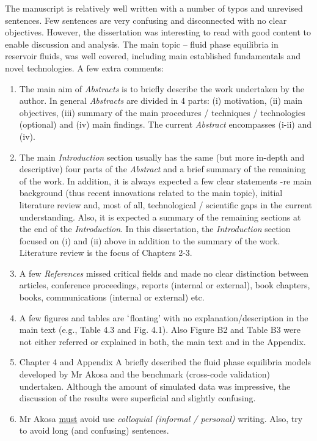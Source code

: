 \documentclass[14pt,twoside]{report}
\begin{document}
The manuscript is relatively well written with a number of typos and unrevised sentences. Few sentences are very confusing and disconnected with no clear objectives. However, the dissertation was interesting to read with good content to enable discussion and analysis. The main topic -- fluid phase equilibria in reservoir fluids, was well covered, including main established fundamentals and novel technologies. A few extra comments:
\begin{enumerate}
\item The main aim of {\it Abstracts} is to briefly describe the work undertaken by the author. In general {\it Abstracts} are divided in 4 parts: (i) motivation, (ii) main objectives, (iii) summary of the main procedures / techniques / technologies (optional) and (iv) main findings. The current {\it Abstract} encompasses (i-ii) and (iv).
%
\item The main {\it Introduction} section usually has the same (but more in-depth and descriptive) four parts of the {\it Abstract} and a brief summary of the remaining of the work. In addition, it is always expected a few clear statements -re main background (thus recent innovations related to the main topic), initial literature review and, most of all, technological / scientific gaps in the current understanding. Also, it is expected a summary of the remaining sections at the end of the {\it Introduction}. In this dissertation, the {\it Introduction} section focused on (i) and (ii) above in addition to the summary of the work. Literature review is the focus of Chapters 2-3.
%
\item A few {\it References} missed critical fields and made no clear distinction between articles, conference proceedings, reports (internal or external), book chapters, books, communications (internal or external) etc.  
%
\item A few figures and tables are $\lq$floating' with no explanation/description in the main text (e.g., Table 4.3 and Fig. 4.1). Also Figure B2 and Table B3 were not either referred or explained in both, the main text and in the Appendix.
%
\item Chapter 4 and Appendix A briefly described the fluid phase equilibria models developed by Mr Akosa and the benchmark (cross-code validation) undertaken. Although the amount of simulated data was impressive, the discussion of the results were superficial and slightly confusing.  
%
\item Mr Akosa \underline{must} avoid use {\it colloquial (informal / personal)} writing. Also, try to avoid long (and confusing) sentences.  
% 
\end{enumerate}
\end{document}
